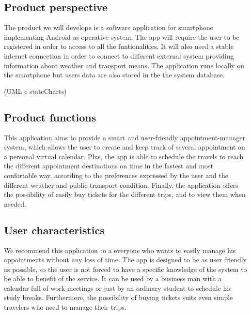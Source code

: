 \subsection{Product perspective} 
The product we will develope is a software application  for smartphone implementing Android as operative system. The app will require the user to be registered in order to access to all the funtionalities. It will also need a stable internet connection in order to connect to different external system providing information about weather and transport means. The application runs locally on the smartphone but users data are also stored in the the system database.

\begin{figure}[!h]
	\centering
\end{figure}

(UML e stateCharts)

\subsection{Product functions}
This application aims to provide a smart and user-friendly appointment-manager system, which allows the user to create and keep track of several appointment on a personal virtual calendar. Plus, the app is able to schedule the travels to reach the different appointment destinations on time in the fastest and most confortable way, according to the preferences expressed by the user and the different weather and public transport condition. Finally, the application offers the possibility of easily buy tickets for the different trips, and to view them when needed.
\subsection{User characteristics}
We recommend this application to a everyone who wants to easily manage his appointments without any loss of time. The app is designed to be as user friendly as possible, so the user is not forced to have a specific knowledge of the system to be able to benefit of the service. It can be used by a business man with a calendar full of work meetings or just by an ordinary student to schedule his study breaks. Furthermore, the possibility of buying tickets suits even simple travelers who need to manage their trips.
